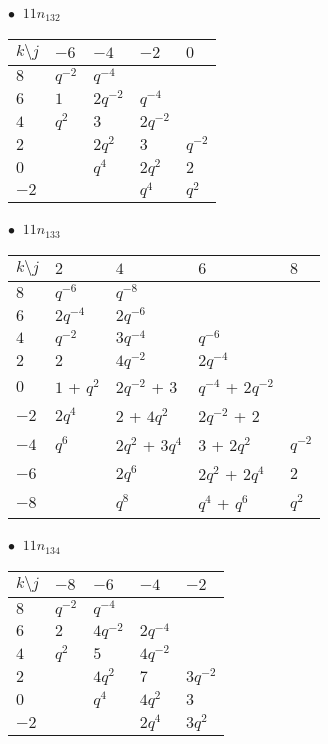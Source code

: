 %
\begin{minipage}{\linewidth}
$\bullet\ $ $11n_{132}$ \vspace{0.5em} \\
\begin{tabular}{l|llll}
$k \setminus j$ & $-6$ & $-4$ & $-2$ & $0$ \\
\hline
$8$ & $q^{-2}$ & $q^{-4}$ &  &  \\
$6$ & $1$ & $2q^{-2}$ & $q^{-4}$ &  \\
$4$ & $q^{2}$ & $3$ & $2q^{-2}$ &  \\
$2$ &  & $2q^{2}$ & $3$ & $q^{-2}$ \\
$0$ &  & $q^{4}$ & $2q^{2}$ & $2$ \\
$-2$ &  &  & $q^{4}$ & $q^{2}$ \\
\end{tabular}
\vspace{2em}
\end{minipage}
%
\begin{minipage}{\linewidth}
$\bullet\ $ $11n_{133}$ \vspace{0.5em} \\
\begin{tabular}{l|llll}
$k \setminus j$ & $2$ & $4$ & $6$ & $8$ \\
\hline
$8$ & $q^{-6}$ & $q^{-8}$ &  &  \\
$6$ & $2q^{-4}$ & $2q^{-6}$ &  &  \\
$4$ & $q^{-2}$ & $3q^{-4}$ & $q^{-6}$ &  \\
$2$ & $2$ & $4q^{-2}$ & $2q^{-4}$ &  \\
$0$ & $1$ + $q^{2}$ & $2q^{-2}$ + $3$ & $q^{-4}$ + $2q^{-2}$ &  \\
$-2$ & $2q^{4}$ & $2$ + $4q^{2}$ & $2q^{-2}$ + $2$ &  \\
$-4$ & $q^{6}$ & $2q^{2}$ + $3q^{4}$ & $3$ + $2q^{2}$ & $q^{-2}$ \\
$-6$ &  & $2q^{6}$ & $2q^{2}$ + $2q^{4}$ & $2$ \\
$-8$ &  & $q^{8}$ & $q^{4}$ + $q^{6}$ & $q^{2}$ \\
\end{tabular}
\vspace{2em}
\end{minipage}
%
\begin{minipage}{\linewidth}
$\bullet\ $ $11n_{134}$ \vspace{0.5em} \\
\begin{tabular}{l|llll}
$k \setminus j$ & $-8$ & $-6$ & $-4$ & $-2$ \\
\hline
$8$ & $q^{-2}$ & $q^{-4}$ &  &  \\
$6$ & $2$ & $4q^{-2}$ & $2q^{-4}$ &  \\
$4$ & $q^{2}$ & $5$ & $4q^{-2}$ &  \\
$2$ &  & $4q^{2}$ & $7$ & $3q^{-2}$ \\
$0$ &  & $q^{4}$ & $4q^{2}$ & $3$ \\
$-2$ &  &  & $2q^{4}$ & $3q^{2}$ \\
\end{tabular}
\vspace{2em}
\end{minipage}
